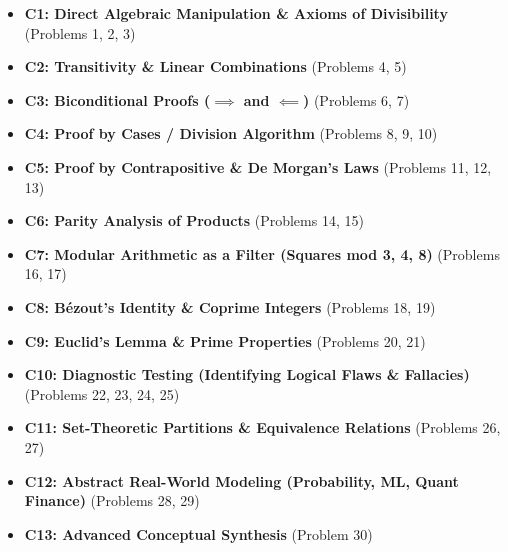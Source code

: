 \documentclass[12pt]{article}
\begin{document}
\begin{itemize}
    \item \textbf{C1: Direct Algebraic Manipulation \& Axioms of Divisibility} (Problems 1, 2, 3)
    \item \textbf{C2: Transitivity \& Linear Combinations} (Problems 4, 5)
    \item \textbf{C3: Biconditional Proofs ($\implies$ and $\impliedby$)} (Problems 6, 7)
    \item \textbf{C4: Proof by Cases / Division Algorithm} (Problems 8, 9, 10)
    \item \textbf{C5: Proof by Contrapositive \& De Morgan's Laws} (Problems 11, 12, 13)
    \item \textbf{C6: Parity Analysis of Products} (Problems 14, 15)
    \item \textbf{C7: Modular Arithmetic as a Filter (Squares mod 3, 4, 8)} (Problems 16, 17)
    \item \textbf{C8: B\'ezout's Identity \& Coprime Integers} (Problems 18, 19)
    \item \textbf{C9: Euclid's Lemma \& Prime Properties} (Problems 20, 21)
    \item \textbf{C10: Diagnostic Testing (Identifying Logical Flaws \& Fallacies)} (Problems 22, 23, 24, 25)
    \item \textbf{C11: Set-Theoretic Partitions \& Equivalence Relations} (Problems 26, 27)
    \item \textbf{C12: Abstract Real-World Modeling (Probability, ML, Quant Finance)} (Problems 28, 29)
    \item \textbf{C13: Advanced Conceptual Synthesis} (Problem 30)
\end{itemize}
\end{document}
